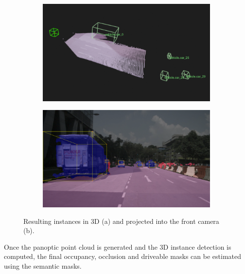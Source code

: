 \begin{figure}[h!]
    \centering
    \begin{subfigure}[b]{0.45\textwidth}
        \includegraphics[width=\textwidth]{images/methodology/3d_cuboids_1.png}
        \caption{}
        \label{fig:instance_scene_images_a}
    \end{subfigure}
    \hfill
    \begin{subfigure}[b]{0.45\textwidth}
        \includegraphics[width=\textwidth]{images/methodology/raw_cuboid_1.png}
        \caption{}
        \label{fig:instance_scene_images_b}
    \end{subfigure}

    \caption{Resulting instances in 3D (a) and projected into the front camera (b).}
    \label{fig:instance_scene_images}
\end{figure}


 \label{sec:instance_bev_mask_methodology}
Once the panoptic point cloud is generated and the 3D instance detection is computed, the final occupancy, occlusion and driveable masks can be estimated using the  semantic masks.


